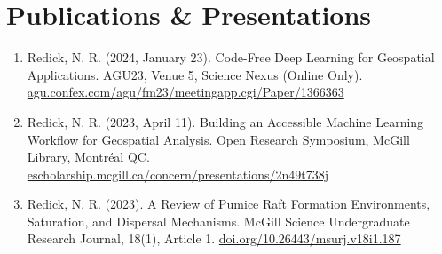 \documentclass[a4paper,10pt]{article}
\def\light#1{{\color{light}#1}}
\begin{document}
\section{Publications \& Presentations}
\spaceaftersectionheading
\begin{enumerate}
    \item Redick, N. R. (2024, January 23). Code-Free Deep Learning for Geospatial Applications. AGU23, Venue 5, Science Nexus (Online Only). \href{https://agu.confex.com/agu/fm23/meetingapp.cgi/Paper/1366363}{agu.confex.com/agu/fm23/meetingapp.cgi/Paper/1366363}
    \spaceaftersections
    \item Redick, N. R. (2023, April 11). Building an Accessible Machine Learning Workflow for Geospatial Analysis. Open Research Symposium, McGill Library, Montr\'eal QC. \href{https://escholarship.mcgill.ca/concern/presentations/2n49t738j?locale=en}{escholarship.mcgill.ca/concern/presentations/2n49t738j}
    \spaceaftersections
    \item Redick, N. R. (2023). A Review of Pumice Raft Formation Environments, Saturation, and Dispersal Mechanisms. McGill Science Undergraduate Research Journal, 18(1), Article 1. \href{https://doi.org/10.26443/msurj.v18i1.187}{doi.org/10.26443/msurj.v18i1.187}
\end{enumerate}
\spaceaftersections



\vfill
\center{\footnotesize \light{Last updated: \today}}
\end{document}
